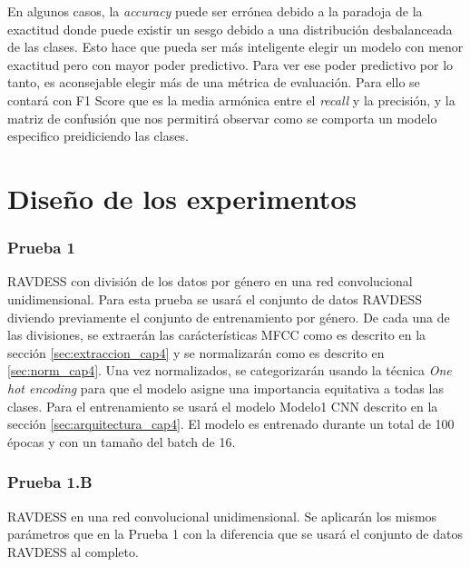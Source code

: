 \documentclass[11pt,a4paper,spanish]{book}
\begin{document}
	En algunos casos, la \emph{accuracy} puede ser errónea debido a la paradoja de la exactitud donde puede existir un sesgo debido a una distribución desbalanceada de las clases. Esto hace que pueda ser más inteligente elegir un modelo con menor exactitud pero con mayor poder predictivo.
	Para ver ese poder predictivo por lo tanto, es aconsejable elegir más de una métrica de evaluación. Para ello se contará con F1 Score que es la media armónica entre el \emph{recall} y la precisión, y la matriz de confusión que nos permitirá observar como se comporta un modelo especifico preidiciendo las clases.
	
	
	\section{Diseño de los experimentos}
	\subsubsection{Prueba 1}
	RAVDESS con división de los datos por género en una red convolucional unidimensional.
	Para esta prueba se usará el conjunto de datos RAVDESS diviendo previamente el conjunto de entrenamiento por género. 
	De cada una de las divisiones, se extraerán las carácterísticas MFCC como es descrito en la sección \ref{sec:extraccion_cap4} y se normalizarán como es descrito en \ref{sec:norm_cap4}. Una vez normalizados, se categorizarán usando la técnica \emph{One hot encoding} para que el modelo asigne una importancia equitativa a todas las clases.
	Para el entrenamiento se usará el modelo Modelo1 CNN descrito en la sección \ref{sec:arquitectura_cap4}. El modelo es entrenado durante un total de 100 épocas y con un tamaño del batch de 16.

	
	\subsubsection{Prueba 1.B}
	RAVDESS en una red convolucional unidimensional.
	Se aplicarán los mismos parámetros que en la Prueba 1 con la diferencia que se usará el conjunto de datos RAVDESS al completo.

	
\end{document}
